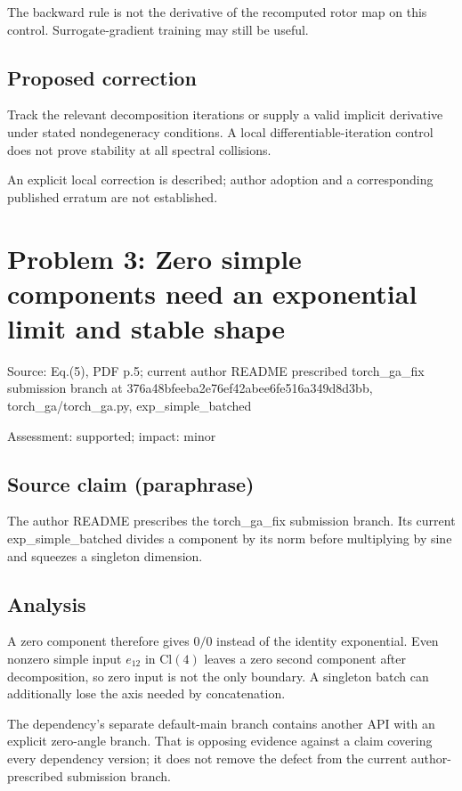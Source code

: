 \documentclass[11pt]{article}
\begin{document}
The backward rule is not the derivative of the recomputed rotor map on this control. Surrogate-gradient training may still be useful.

\subsection*{Proposed correction}

Track the relevant decomposition iterations or supply a valid implicit derivative under stated nondegeneracy conditions. A local differentiable-iteration control does not prove stability at all spectral collisions.

An explicit local correction is described; author adoption and a corresponding published erratum are not established.

\section*{Problem 3: Zero simple components need an exponential limit and stable shape}

Source: Eq.(5), PDF p.5; current author README prescribed torch\_ga\_fix submission branch at 376a48bfeeba2e76ef42abee6fe516a349d8d3bb, torch\_ga/torch\_ga.py, exp\_simple\_batched

Assessment: supported; impact: minor

\subsection*{Source claim (paraphrase)}

The author README prescribes the torch\_ga\_fix submission branch. Its current exp\_simple\_batched divides a component by its norm before multiplying by sine and squeezes a singleton dimension.

\subsection*{Analysis}

A zero component therefore gives \(0/0\) instead of the identity exponential. Even nonzero simple input \(e_{12}\) in \(\mathrm{Cl}(4)\) leaves a zero second component after decomposition, so zero input is not the only boundary. A singleton batch can additionally lose the axis needed by concatenation.

The dependency’s separate default-main branch contains another API with an explicit zero-angle branch. That is opposing evidence against a claim covering every dependency version; it does not remove the defect from the current author-prescribed submission branch.
\end{document}

